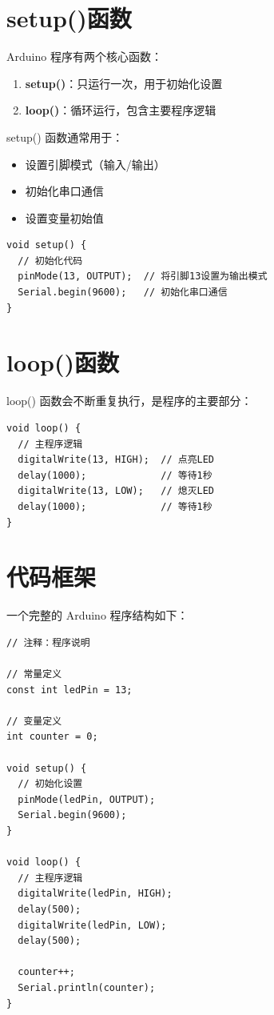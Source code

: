 \documentclass[12pt,UTF8]{ctexbook}
\begin{document}
\section{setup()函数}

Arduino 程序有两个核心函数：

\begin{enumerate}
    \item \textbf{setup()}：只运行一次，用于初始化设置
    \item \textbf{loop()}：循环运行，包含主要程序逻辑
\end{enumerate}

setup() 函数通常用于：
\begin{itemize}
    \item 设置引脚模式（输入/输出）
    \item 初始化串口通信
    \item 设置变量初始值
\end{itemize}

\begin{lstlisting}
void setup() {
  // 初始化代码
  pinMode(13, OUTPUT);  // 将引脚13设置为输出模式
  Serial.begin(9600);   // 初始化串口通信
}
\end{lstlisting}

\section{loop()函数}

loop() 函数会不断重复执行，是程序的主要部分：

\begin{lstlisting}
void loop() {
  // 主程序逻辑
  digitalWrite(13, HIGH);  // 点亮LED
  delay(1000);             // 等待1秒
  digitalWrite(13, LOW);   // 熄灭LED
  delay(1000);             // 等待1秒
}
\end{lstlisting}

\section{代码框架}

一个完整的 Arduino 程序结构如下：

\begin{lstlisting}
// 注释：程序说明

// 常量定义
const int ledPin = 13;

// 变量定义
int counter = 0;

void setup() {
  // 初始化设置
  pinMode(ledPin, OUTPUT);
  Serial.begin(9600);
}

void loop() {
  // 主程序逻辑
  digitalWrite(ledPin, HIGH);
  delay(500);
  digitalWrite(ledPin, LOW);
  delay(500);
  
  counter++;
  Serial.println(counter);
}
\end{lstlisting}
\end{document}
